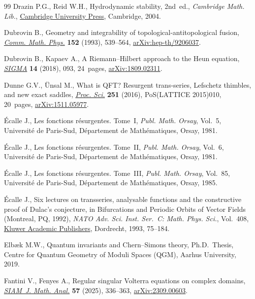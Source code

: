\documentclass[10pt,a4paper]{amsart}
\numberwithin{equation}{section}
\begin{document}
\begin{thebibliography}{99}
Drazin P.G., Reid W.H., Hydrodynamic stability, 2nd~ed., \textit{Cambridge Math. Lib.},
 \href{https://doi.org/10.1017/CBO9780511616938}{Cambridge University Press},
 Cambridge, 2004.

Dubrovin B., Geometry and integrability of topological-antitopological fusion,
 \href{https://doi.org/10.1007/BF02096618}{\textit{Comm. Math. Phys.}}
 \textbf{152} (1993), 539--564,
 \href{http://arxiv.org/abs/hep-th/9206037}{arXiv:hep-th/9206037}.

Dubrovin B., Kapaev A., A {R}iemann--{H}ilbert approach to the {H}eun equation,
 \href{https://doi.org/10.3842/SIGMA.2018.093}{\textit{SIGMA}} \textbf{14}
 (2018), 093, 24~pages,
 \href{http://arxiv.org/abs/1809.02311}{arXiv:1809.02311}.

Dunne G.V., \"Unsal M., What is QFT? Resurgent trans-series, Lefschetz
 thimbles, and new exact saddles,
 \href{https://doi.org/10.22323/1.251.0010}{\textit{Proc. Sci.}} \textbf{251}
 (2016), PoS(LATTICE 2015)010, 20~pages,
 \href{http://arxiv.org/abs/1511.05977}{arXiv:1511.05977}.

{\'E}calle J., Les fonctions r\'esurgentes. {T}ome~{I}, \textit{Publ. Math.
 Orsay}, Vol.~5, Universit\'e de Paris-Sud, D\'epartement de Math\'ematiques,
 Orsay, 1981.

{\'E}calle J., Les fonctions r\'esurgentes. {T}ome~{II}, \textit{Publ. Math.
 Orsay}, Vol.~6, Universit\'e de Paris-Sud, D\'epartement de Math\'ematiques,
 Orsay, 1981.

{\'E}calle J., Les fonctions r\'esurgentes. {T}ome~{III}, \textit{Publ. Math.
 Orsay}, Vol.~85, Universit\'e de Paris-Sud, D\'epartement de Math\'ematiques,
 Orsay, 1985.

{\'E}calle J., Six lectures on transseries, analysable functions and the
 constructive proof of {D}ulac's conjecture, in Bifurcations and {P}eriodic
 {O}rbits of {V}ector {F}ields ({M}ontreal, {PQ}, 1992), \textit{NATO Adv.
 Sci. Inst. Ser.~C: Math. Phys. Sci.}, Vol.~408,
 \href{https://doi.org/10.1007/978-94-015-8238-4_3}{Kluwer Academic
 Publishers}, Dordrecht, 1993, 75--184.

Elb{\ae}k M.W., Quantum invariants and {C}hern--{S}imons theory, Ph.D.~Thesis,
 {C}entre for Quantum Geometry of Moduli Spaces (QGM), Aarhus University,
 2019.

Fantini V., Fenyes A., Regular singular {V}olterra equations on complex
 domains, \href{https://doi.org/10.1137/23M1613876}{\textit{SIAM~J. Math.
 Anal.}} \textbf{57} (2025), 336--363,
 \href{http://arxiv.org/abs/2309.00603}{arXiv:2309.00603}.


\end{thebibliography}
\end{document}
